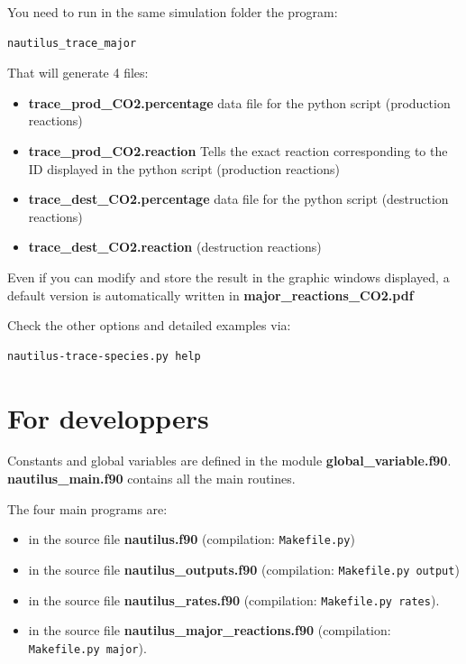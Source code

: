 \documentclass[english,a4paper,twoside]{article}
\begin{document}
You need to run in the same simulation folder the program:
\begin{verbatim}
nautilus_trace_major
\end{verbatim}
That will generate 4 files:
\begin{itemize}
\item \textbf{trace\_prod\_CO2.percentage} data file for the python script (production reactions)
\item \textbf{trace\_prod\_CO2.reaction} Tells the exact reaction corresponding to the ID displayed in the python script (production reactions)
\item \textbf{trace\_dest\_CO2.percentage} data file for the python script (destruction reactions)
\item \textbf{trace\_dest\_CO2.reaction} (destruction reactions)
\end{itemize}

Even if you can modify and store the result in the graphic windows displayed, a default version is automatically written in \textbf{major\_reactions\_CO2.pdf} 

Check the other options and detailed examples via:
\begin{verbatim}
nautilus-trace-species.py help
\end{verbatim}

\section{For developpers}\label{sec:advanced}
Constants and global variables are defined in the module \textbf{global\_variable.f90}. \textbf{nautilus\_main.f90} contains all the main routines. 

The four main programs are:
\begin{itemize}
\item {} in the source file \textbf{nautilus.f90} (compilation:  \verb|Makefile.py|)
\item {} in the source file \textbf{nautilus\_outputs.f90} (compilation: \verb|Makefile.py output|)
\item {} in the source file \textbf{nautilus\_rates.f90} (compilation: \verb|Makefile.py rates|).
\item {} in the source file \textbf{nautilus\_major\_reactions.f90} (compilation: \\ \verb|Makefile.py major|).
\end{itemize}
\end{document}
